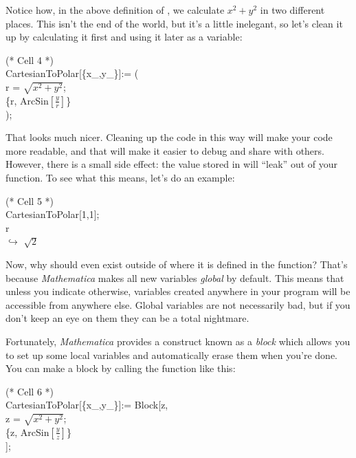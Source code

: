 Notice how, in the above definition of , we calculate $x^2 + y^2$ in two different places. This isn't the end of the world, but it's a little inelegant, so let's clean it up by calculating it first and using it later as a variable:

\begin{code}
	   (* Cell 4 *)\\
	   CartesianToPolar[\{x\_,y\_\}]:= (\\
	   	r = $\sqrt{x^2 + y^2}$;\\
	   	\{r, ArcSin$\left[\frac{y}{r}\right]$\}\\
	   );\\
\end{code}

That looks much nicer. Cleaning up the code in this way will make your code more readable, and that will make it easier to debug and share with others. However, there is a small side effect: the value stored in  will ``leak'' out of your function. To see what this means, let's do an example:

\begin{code}
	   (* Cell 5 *)\\
	   CartesianToPolar[{1,1}];\\
	   r\\
	   $\hookrightarrow$ $\sqrt{2}$
\end{code}

Now, why should  even exist outside of where it is defined in the  function? That's because \emph{Mathematica} makes all new variables \emph{global} by default. This means that unless you indicate otherwise, variables created anywhere in your program will be accessible from anywhere else. Global variables are not necessarily bad, but if you don't keep an eye on them they can be a total nightmare.

Fortunately, \emph{Mathematica} provides a construct known as a \emph{block} which allows you to set up some local variables and automatically erase them when you're done. You can make a block by calling the  function like this:

\begin{code}
	   (* Cell 6 *)\\
	   CartesianToPolar[\{x\_,y\_\}]:= Block[{z},\\
			 z = $\sqrt{x^2 + y^2}$;\\
			 \{z, ArcSin$\left[\frac{y}{z}\right]$\}\\
	   ];\\
\end{code}

